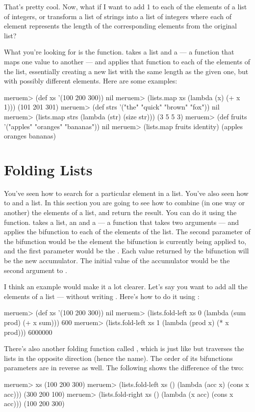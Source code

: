 That's pretty cool. Now, what if I want to add 1 to each of the elements of a list of integers, or transform a list of strings into a list of integers where each of element represents the length of the corresponding elements from the original list?

What you're looking for is the  function.  takes a list and a  --- a function that maps one value to another --- and applies that function to each of the elements of the list, essentially creating a new list with the same length as the given one, but with possibly different elements. Here are some examples:

\begin{REPL}
meruem> (def xs '(100 200 300))
nil
meruem> (lists.map xs (lambda (x) (+ x 1)))
(101 201 301)
meruem> (def strs '("the" "quick" "brown" "fox"))
nil
meruem> (lists.map strs (lambda (str) (size str)))
(3 5 5 3)
meruem> (def fruits '("apples" "oranges" "bananas"))
nil
meruem> (lists.map fruits identity)
(apples oranges bananas)
\end{REPL}

\section{Folding Lists}
You've seen how to search for a particular element in a list. You've also seen how to  and  a list. In this section you are going to see how to combine (in one way or another) the elements of a list, and return the result.  You can do it using the  function.   takes a list, an  and a  --- a function that takes two arguments --- and applies the bifunction to each of the elements of the list. The second parameter of the bifunction would be the element the bifunction is currently being applied to, and the first parameter would be the . Each value returned by the bifunction will be the new accumulator. The initial value of the accumulator would be the second argument to . 

I think an example would make it a lot clearer. Let's say you want to add all the elements of a list --- without writing . Here's how to do it using :

\begin{REPL}
meruem> (def xs '(100 200 300))
nil
meruem> (lists.fold-left xs 0 (lambda (sum prod) (+ x sum)))
600
meruem> (lists.fold-left xs 1 (lambda (prod x) (* x prod)))
6000000
\end{REPL}

There's also another folding function called , which is just like  but traverses the lists in the opposite direction (hence the name). The order of its bifunctions parameters are in reverse as well. The following shows the difference of the two:

\begin{REPL}
meruem> xs
(100 200 300)
meruem> (lists.fold-left xs () (lambda (acc x) (cons x acc)))
(300 200 100)
meruem> (lists.fold-right xs () (lambda (x acc) (cons x acc)))
(100 200 300)
\end{REPL}